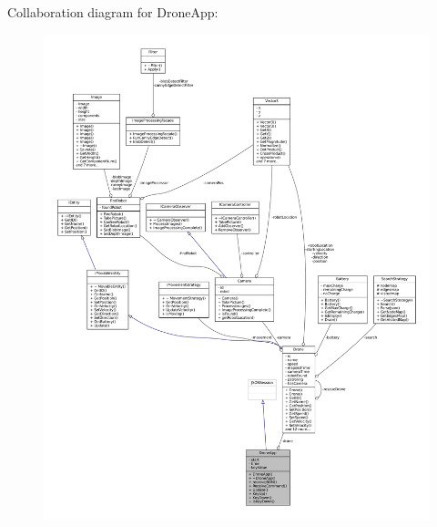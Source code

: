 Collaboration diagram for Drone\+App\+:\nopagebreak
\begin{figure}[H]
\begin{center}
\leavevmode
\includegraphics[width=350pt]{classDroneApp__coll__graph}
\end{center}
\end{figure}
